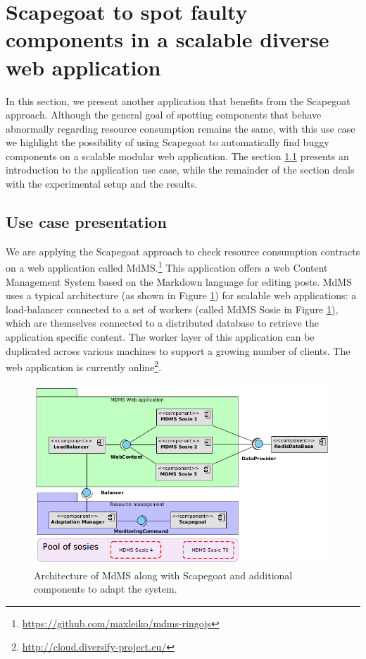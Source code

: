 \section{Scapegoat to spot faulty components in a scalable diverse web application}\label{sec:WebStudy}
In this section, we present another application that benefits from the Scapegoat approach.
Although the general goal of spotting components that behave abnormally regarding resource consumption remains the same, with this use case we highlight the possibility of using Scapegoat 
to automatically find buggy components on a scalable modular web application.
The section \ref{MdMS} presents an introduction to the application use case, while the remainder of the section deals with the experimental setup and the results.


\subsection{Use case presentation}\label{MdMS}
We are applying the Scapegoat approach to check resource consumption contracts on a web application called MdMS.\footnote{\url{https://github.com/maxleiko/mdms-ringojs}}
This application offers a web Content Management System based on the Markdown language for editing posts. 
MdMS uses a typical architecture (as shown in Figure \ref{fig:webapp}) for scalable web applications: a load-balancer connected to a set of workers (called MdMS Sosie in Figure \ref{fig:webapp}), which are themselves connected to a distributed database to retrieve the application specific content.
The worker layer of this application can be duplicated across various machines to support a growing number of clients.
The web application is currently online\footnote{\url{http://cloud.diversify-project.eu/}}. 

\begin{figure}[!bt]
	\centering
	\includegraphics[scale=0.45]{./chapter5/figures/webapp2}
	\caption{\label{fig:webapp}Architecture of MdMS along with Scapegoat and additional components to adapt the system.}
\end{figure}

